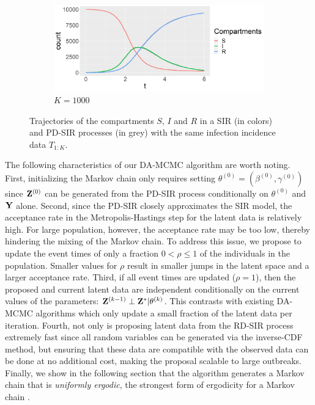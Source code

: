 \documentclass[11pt]{article}
\begin{document}
\begin{figure}
\begin{subfigure}[b]{0.49\textwidth}
			\centering
			\includegraphics[width=\textwidth]{E2_K1000}
			\caption{$K = 1000$}
			\label{fig:comparison_RD_SIR_K1000}
		\end{subfigure}
		\caption{Trajectories of the compartments $S$, $I$ and $R$ in a SIR (in colors) and PD-SIR processes (in grey) with the same infection incidence data $T_{1:K}$.}
		\label{fig:comparison}
	\end{figure}
	\smallskip
	
	The following characteristics of our DA-MCMC algorithm are worth noting.
	First, initializing the Markov chain only requires setting $\theta^{(0)} = (\beta^{(0)}, \gamma^{(0)})$ since $\mathbf{Z}^{(0)}$ can be generated from the PD-SIR process conditionally on $\theta^{(0)}$ and $\mathbf{Y}$ alone.
	Second, since the PD-SIR closely approximates the SIR model, the acceptance rate in the Metropolis-Hastings step for the latent data is relatively high. For large population, however, the acceptance rate may be too low, thereby hindering the mixing of the Markov chain. To address this issue, we propose to update the event times of only a fraction $0<\rho\le 1$ of the individuals in the population. Smaller values for $\rho$ result in smaller jumps in the latent space and a larger acceptance rate.
	Third, if all event times are updated ($\rho = 1$), then the proposed and current latent data are independent conditionally on the current values of the parameters: $\mathbf{Z}^{(k-1)} \perp \mathbf{Z}^* | \theta^{(k)}$. This contrasts with existing DA-MCMC algorithms which only update a small fraction of the latent data per iteration.
	Fourth, not only is proposing latent data from the RD-SIR process extremely fast since all random variables can be generated via the inverse-CDF method, but ensuring that these data are compatible with the observed data can be done at no additional cost, making the proposal scalable to large outbreaks.
	Finally, we show in the following section that the algorithm generates a Markov chain that is \textit{uniformly ergodic}, the strongest form of ergodicity for a Markov chain \cite{Tierney.1994}. %
	
\end{document}
